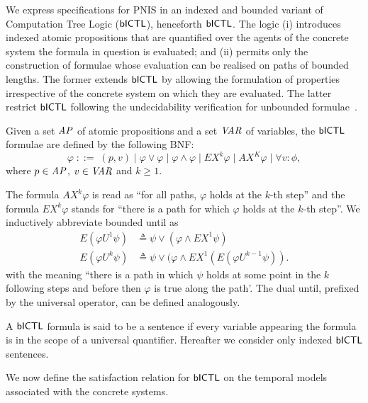 We express specifications for PNIS in an indexed and bounded variant of
Computation Tree Logic ($\sf{bICTL}$), henceforth $\sf{bICTL}$. The logic (i) introduces
indexed atomic propositions that are quantified over the agents of the concrete
system the formula in question is evaluated; and (ii) permits only the
construction of formulae whose evaluation can be realised on paths of bounded
lengths. The former extends $\sf{bICTL}$ by allowing the formulation of properties
irrespective of the concrete system on which they are evaluated.  The latter
restrict $\sf{bICTL}$ following the undecidability verification for unbounded
formulae~\cite{Akintunde+20}.

\begin{definition}
Given a  set $\it{AP}$ of atomic propositions and a set $\it{VAR}$ of variables,
the $\sf{bICTL}$  formulae are defined by the following BNF:
\[
  \varphi \;   ::= \; (p, v) \mid \varphi \lor \varphi \mid \varphi \land \varphi
  \mid EX^k \varphi \mid AX^K \varphi \mid \forall v : \phi,
\]
where  $p \in \it{AP}$, $v \in \it{VAR}$ and $k \geq  1$.
\end{definition}

The formula $AX^k \varphi$ is read as ``for all paths, $\varphi$ holds at the
$k$-th step'' and the formula $EX^k \varphi$ stands for ``there is a path for
which $\varphi$ holds at the $k$-th step''. We inductively abbreviate bounded until as
\begin{align*}
 E(\varphi U^1 \psi) &\triangleq \psi \lor (\varphi \land EX^1 \psi) \\
 E(\varphi U^k \psi) &\triangleq \psi \lor (\varphi \land EX^1 (E (\varphi U^{k-1} \psi)).
\end{align*}
with the meaning ``there is a path in which $\psi$ holds at some point in the
$k$ following steps and before then $\varphi$ is true along the path'. The dual
until, prefixed by the universal operator, can be defined analogously.

A $\sf{bICTL}$ formula is said to be a sentence if every variable appearing the
formula is in the scope of a universal quantifier. Hereafter we consider only
indexed $\sf{bICTL}$ sentences.

We now define the satisfaction relation for $\sf{bICTL}$ on the temporal models
associated with the concrete systems.

